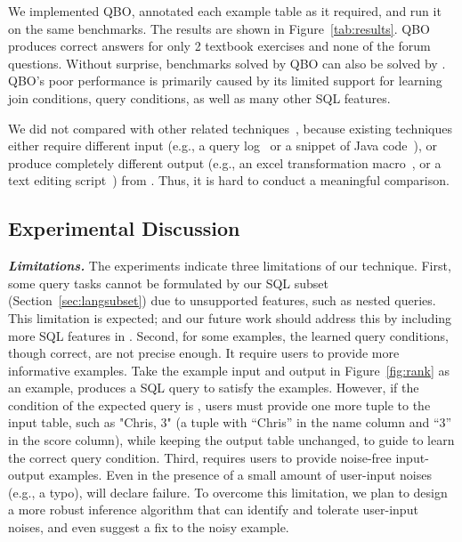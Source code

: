 We implemented QBO, annotated
each example table as it required, and run it
on the same benchmarks. The results are shown in Figure~\ref{tab:results}.
QBO produces correct answers
for only 2 textbook exercises and none of the forum questions.
Without surprise, 
benchmarks solved by QBO can also be solved by \ourtool.
QBO's poor performance is primarily caused by its
limited support for learning join conditions,
query conditions, as well as many other SQL features.

We did not compared \ourtool with other related techniques~\cite{Howe:2011,
abs-1208-2013, Harris:2011, Kandel:2011}, because
existing techniques either require different input
(e.g., a query log~\cite{Khoussainova:2010, Howe:2011}
or a snippet of Java code~\cite{abs-1208-2013}), 
or produce completely different
output (e.g., an excel transformation macro~\cite{Harris:2011}, or a
text editing script~\cite{Kandel:2011}) from \ourtool.
Thus, it is hard to conduct a meaningful comparison.

\subsection{Experimental Discussion}

\noindent \textbf{\textit{Limitations.}}
The experiments indicate three limitations
of our technique. First, some query tasks
cannot be formulated by our SQL subset (Section~\ref{sec:langsubset})
due to unsupported features, such as
nested queries. This limitation is expected;
and our future work
should address this by including more SQL
features in \ourtool.
Second, for some examples, the learned query
conditions, though correct, are not precise
enough. It require users to provide more informative examples.
Take the example input and output in Figure~\ref{fig:rank}
as an example, \ourtool produces a SQL
query 
to satisfy the examples. However, if
the condition of the expected query
is , users must provide
one more tuple to the input table, such as "Chris, 3"
(a tuple with ``Chris'' in the name column and ``3''
in the score column), while keeping the output table
unchanged, 
to guide \ourtool to learn the correct query condition.
Third, \ourtool requires
users to provide noise-free input-output examples.
Even in the presence of a small amount of user-input
noises (e.g., a typo), \ourtool will declare failure.
To overcome this limitation, we plan to design a more
robust inference algorithm that can identify
and tolerate user-input noises, and even suggest a fix
to the noisy example.


